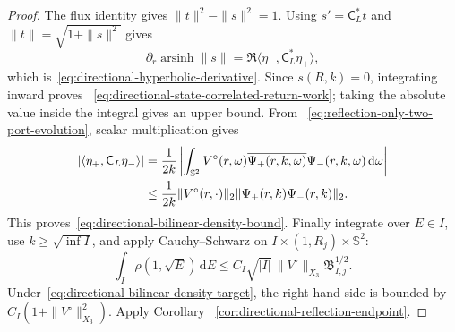 \documentclass[11pt]{article}
\newcommand{\dd}{\,\mathrm d}
\theoremstyle{definition}
\theoremstyle{remark}
\begin{document}
\begin{proof}
The flux identity gives $\|t\|^2-\|s\|^2=1$.  Using
$s'=\mathsf C_L^*t$ and $\|t\|=\sqrt{1+\|s\|^2}$ gives
\begin{equation}
 \partial_r\operatorname{arsinh}\|s\|
 =\Re\langle\eta_-,\mathsf C_L^*\eta_+\rangle,
\end{equation}
which is~\eqref{eq:directional-hyperbolic-derivative}.  Since $s(R,k)=0$,
integrating inward proves
~\eqref{eq:directional-state-correlated-return-work}; taking the absolute
value inside the integral gives an upper bound.  From
~\eqref{eq:reflection-only-two-port-evolution}, scalar multiplication gives
\begin{align}
 |\langle\eta_+,\mathsf C_L\eta_-\rangle|
 &=\frac1{2k}\left|
   \int_{\mathbb S^2}V^\circ(r,\omega)
   \overline{\Psi_+(r,k,\omega)}\Psi_-(r,k,\omega)\dd\omega
  \right|\notag\\
 &\leq\frac1{2k}\|V^\circ(r,\cdot)\|_2
       \|\Psi_+(r,k)\Psi_-(r,k)\|_2.
\end{align}
This proves~\eqref{eq:directional-bilinear-density-bound}.  Finally integrate
over $E\in I$, use $k\geq\sqrt{\inf I}$, and apply Cauchy--Schwarz on
$I\times(1,R_j)\times\mathbb S^2$:
\begin{equation}
 \int_I\rho(1,\sqrt E)\dd E
 \leq C_I\sqrt{|I|}\,\|V^\circ\|_{X_3}
       \mathfrak B_{I,j}^{1/2}.
\end{equation}
Under~\eqref{eq:directional-bilinear-density-target}, the right-hand side is
bounded by $C_I(1+\|V^\circ\|_{X_3}^2)$.  Apply Corollary
~\ref{cor:directional-reflection-endpoint}.
\end{proof}
\end{document}
